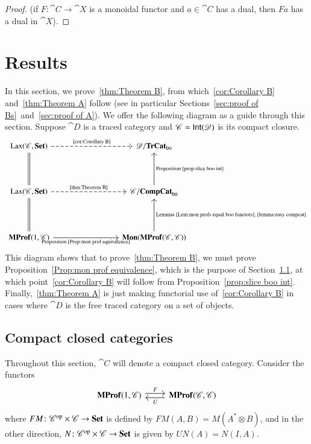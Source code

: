 \documentclass[12pt,oneside,article,draft]{memoir}
\begin{document}
\begin{proof}
(if $F\colon\cat{C}\to\cat{X}$ is a monoidal functor and $a\in\cat{C}$ has a dual, then $Fa$ has a dual in $\cat{X}$).

\end{proof}




\chapter{Results}\label{sec:generalization}

In this section, we prove~\ref{thm:Theorem B}, from which~\ref{cor:Corollary B} and~\ref{thm:Theorem A} follow (see in particular Sections~\ref{sec:proof of Bs}~and~\ref{sec:proof of A}). We offer the following diagram as a guide through this section. Suppose $\cat{D}$ is a traced category and $\mathscr{C}=\mathsf{Int}(\mathscr{D})$ is its compact closure. 
\[
\begin{tikzcd}[column sep=3cm,row sep=1.5cm]
\Lax(\cat{C},\Set)\ar[r,dashed,"\tn{\ref{cor:Corollary B}}"]\ar[d,equal]&\cat{D}/\TrCat_{\bo}\\
\Lax(\cat{C},\Set)\ar[r,dashed,"\tn{\ref{thm:Theorem B}}"]\ar[d,equal]&\cat{C}/\CompCat_{\bo}\ar[u,"\tn{Proposition~\ref{prop:slice boo int}}"']\\
\MProf(1,\cat{C})\ar[r,"\tn{Proposition~\ref{Prop:mon prof equivalence}}"']&\Mon(\MProf(\cat{C},\cat{C}))\ar[u,"\tn{Lemmas~\ref{Lem:mon profs equal boo functors},\ \ref{lemma:easy compcat}}"']
\end{tikzcd}
\]
This diagram shows that to prove~\ref{thm:Theorem B}, we must prove Proposition~\ref{Prop:mon prof equivalence}, which is the purpose of Section~\ref{sec:ccc's}, at which point~\ref{cor:Corollary B} will follow from Proposition~\ref{prop:slice boo int}. Finally,~\ref{thm:Theorem A} is just making functorial use of~\ref{cor:Corollary B} in cases where $\cat{D}$ is the free traced category on a set of objects.

\section{Compact closed categories}\label{sec:ccc's}


Throughout this section, $\cat{C}$ will denote a compact closed category. Consider the functors
\begin{equation}\label{eqn:functors 1C CC}
\begin{tikzcd}
	\MProf(1,\cat{C}) \ar[r,shift left,"F"]
	& \MProf(\cat{C},\cat{C}) \ar[l,shift left,"U"]
\end{tikzcd}
\end{equation}
where $FM\colon{\mathscr{C}}^{\text{op}}\times\mathscr{C}\to\mathbf{Set}$ is defined by $FM(A,B)=M(A^*\otimes B)$, and in the other direction, $N\colon{\mathscr{C}}^{\text{op}}\times\mathscr{C}\to\mathbf{Set}$ is given by $UN(A)=N(I,A)$.
\end{document}
